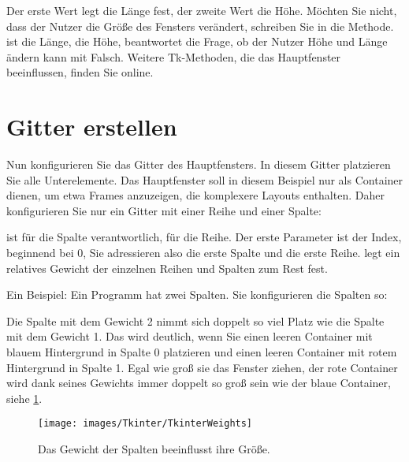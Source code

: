 Der erste Wert legt die Länge fest, der zweite Wert die Höhe. Möchten Sie nicht, dass der Nutzer die Größe des Fensters verändert, schreiben Sie  in die Methode.  ist die Länge,  die Höhe,  beantwortet die Frage, ob der Nutzer Höhe und Länge ändern kann mit Falsch. Weitere Tk-Methoden, die das Hauptfenster beeinflussen, finden Sie online.

\section{Gitter erstellen}

Nun konfigurieren Sie das Gitter des Hauptfensters. In diesem Gitter platzieren Sie alle Unterelemente. Das Hauptfenster soll in diesem Beispiel nur als Container dienen, um etwa Frames anzuzeigen, die komplexere Layouts enthalten. Daher konfigurieren Sie nur ein Gitter mit einer Reihe und einer Spalte:

\medskip



\medskip

 ist für die Spalte verantwortlich,  für die Reihe. Der erste Parameter ist der Index, beginnend bei 0, Sie adressieren also die erste Spalte und die erste Reihe.  legt ein relatives Gewicht der einzelnen Reihen und Spalten zum Rest fest.

Ein Beispiel: Ein Programm hat zwei Spalten. Sie konfigurieren die Spalten so:

\medskip



\medskip

Die Spalte mit dem Gewicht 2 nimmt sich doppelt so viel Platz wie die Spalte mit dem Gewicht 1. Das wird deutlich, wenn Sie einen leeren Container mit blauem Hintergrund in Spalte 0 platzieren und einen leeren Container mit rotem Hintergrund in Spalte 1. Egal wie groß sie das Fenster ziehen, der rote Container wird dank seines Gewichts immer doppelt so groß sein wie der blaue Container, siehe \ref{TkinterWeights}.


\begin{figure}
    \texttt{[image: images/Tkinter/TkinterWeights]}
    \caption{Das Gewicht der Spalten beeinflusst ihre Größe.} \label{TkinterWeights}
\end{figure}

